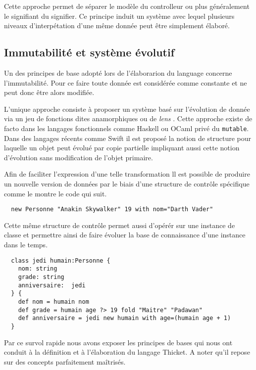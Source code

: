 \documentclass[twoside,a4paper]{article}
\begin{document}
Cette  approche permet  de séparer  le modèle  du controlleur  ou plus
généralement le signifiant du signifier. Ce principe induit un système
avec lequel  plusieurs niveaux d'interpétation d'une  même donnée peut
être simplement élaboré.

\subsection{Immutabilité et système évolutif}

Un  des principes  de base  adopté lors  de l'élaborarion  du language
concerne  l'immutabilité. Pour  ce faire  toute donnée  est considérée
comme constante et ne peut donc être alors modifiée.

L'unique approche consiste à proposer  un système basé sur l'évolution
de donnée via un jeu de fonctions dites anamorphiques ou de {\em lens}
\cite{catamorphismes}.   Cette  approche  existe  de  facto  dans  les
langages fonctionnels comme  Haskell ou OCaml privé  du {\tt mutable}.
Dans des langages  récents comme Swift \cite{swift} il  est proposé la
notion  de structure  pour laquelle  un  objet peut  évolué par  copie
partielle impliquant aussi cette  notion d'évolution sans modification
de l'objet primaire.

Afin  de  faciliter l'expression  d'une  telle  transformation ll  est
possible de produire un nouvelle version de données par le biais d'une
structure de contrôle spécifique comme le montre le code qui suit.

\lstset{language=Thicket}
\begin{lstlisting}
  new Personne "Anakin Skywalker" 19 with nom="Darth Vader"
\end{lstlisting}

Cette  même  structure  de  contrôle permet  aussi  d'opérér  sur  une
instance de  classe et  permettre ainsi  de faire  évoluer la  base de
connaissance d'une instance dans le temps.

\lstset{language=Thicket}
\begin{lstlisting}
  class jedi humain:Personne {
    nom: string
    grade: string
    anniversaire:  jedi
  } {
    def nom = humain nom
    def grade = humain age ?> 19 fold "Maitre" "Padawan"
    def anniversaire = jedi new humain with age=(humain age + 1)
  }
\end{lstlisting}

Par ce  survol rapide nous  avons exposer  les principes de  bases qui
nous  ont  conduit à  la  définition  et  à l'élaboration  du  langage
Thicket. A noter qu'il repose sur des concepts parfaitement maîtrisés.
\end{document}
